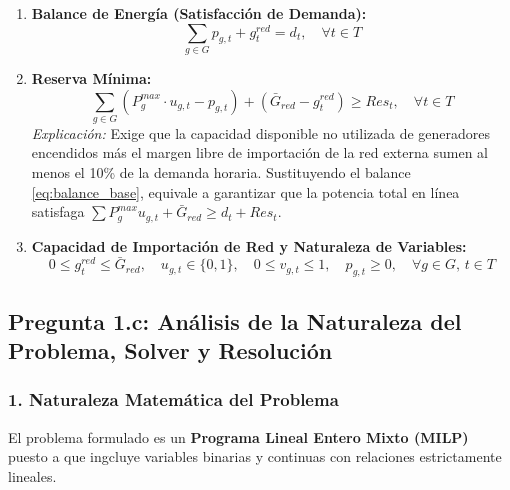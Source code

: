\documentclass[10pt,letterpaper]{article}
\begin{document}
\begin{enumerate}[label=\textbf{R\arabic*.}]
    \item \textbf{Balance de Energía (Satisfacción de Demanda):}
    \begin{equation}
        \sum_{g \in G} p_{g,t} + g_t^{red} = d_t, \quad \forall t \in T \label{eq:balance_base}
    \end{equation}
    
    \item \textbf{Reserva Mínima:}
    \begin{equation}
        \sum_{g \in G} \left( P_g^{max} \cdot u_{g,t} - p_{g,t} \right) + \left( \bar{G}_{red} - g_t^{red} \right) \ge Res_t, \quad \forall t \in T \label{eq:reserva_base}
    \end{equation}
    \textit{Explicación:} Exige que la capacidad disponible no utilizada de generadores encendidos más el margen libre de importación de la red externa sumen al menos el 10\% de la demanda horaria. Sustituyendo el balance \eqref{eq:balance_base}, equivale a garantizar que la potencia total en línea satisfaga $\sum P_g^{max} u_{g,t} + \bar{G}_{red} \ge d_t + Res_t$.
    
    \item \textbf{Capacidad de Importación de Red y Naturaleza de Variables:}
    \begin{equation}
        0 \le g_t^{red} \le \bar{G}_{red}, \quad u_{g,t} \in \{0, 1\}, \quad 0 \le v_{g,t} \le 1, \quad p_{g,t} \ge 0, \quad \forall g \in G, \, t \in T \label{eq:naturaleza}
    \end{equation}
\end{enumerate}

\subsection{Pregunta 1.c: Análisis de la Naturaleza del Problema, Solver y Resolución}
\label{subsec:1c}

\subsubsection*{1. Naturaleza Matemática del Problema}
El problema formulado es un \textbf{Programa Lineal Entero Mixto (MILP)} puesto a que ingcluye variables binarias y continuas con relaciones estrictamente lineales.
\end{document}
